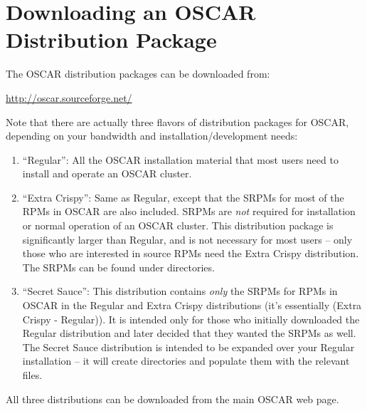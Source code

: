 %
% 
%
%
%

\section{Downloading an OSCAR Distribution Package}
\label{sec:download}

The OSCAR distribution packages can be downloaded from:

\vspace{11pt}
\centerline{\url{http://oscar.sourceforge.net/}}
\vspace{11pt}

Note that there are actually three flavors of distribution packages
for OSCAR, depending on your bandwidth and installation/development
needs:

\begin{enumerate}
\item ``Regular'': All the OSCAR installation material that most users
  need to install and operate an OSCAR cluster.
  
\item ``Extra Crispy'': Same as Regular, except that the SRPMs for
  most of the RPMs in OSCAR are also included.  SRPMs are {\em not}
  required for installation or normal operation of an OSCAR cluster.
  This distribution package is significantly larger than Regular, and
  is not necessary for most users -- only those who are interested in
  source RPMs need the Extra Crispy distribution.  The SRPMs can be
  found under  directories.
  
\item ``Secret Sauce'': This distribution contains {\em only} the
  SRPMs for RPMs in OSCAR in the Regular and Extra Crispy
  distributions (it's essentially (Extra Crispy - Regular)).  It is
  intended only for those who initially downloaded the Regular
  distribution and later decided that they wanted the SRPMs as well.
  The Secret Sauce distribution is intended to be expanded over your
  Regular installation -- it will create 
  directories and populate them with the relevant 
  files.
\end{enumerate}

All three distributions can be downloaded from the main OSCAR web
page.



